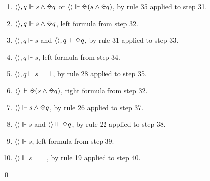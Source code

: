 \begin{myEx}
\begin{enumerate}
\item $\langle \rangle, q \Vdash s \land \LTLonce q$ or $\langle \rangle \Vdash \LTLonce(s \land \LTLonce q)$, by rule 35 applied to step 31.\\ %

\item $\langle \rangle, q \Vdash s \land \LTLonce q$, left formula from step 32.\\ %

\item $\langle \rangle, q \Vdash s$ and $\langle \rangle, q \Vdash \LTLonce q$, by rule 31 applied to step 33.\\ %

\item $\langle \rangle, q \Vdash s$, left formula from step 34.\\ %

\item $\langle \rangle, q \Vdash s = \bot$, by rule 28 applied to step 35.\\ %

\item $\langle \rangle \Vdash \LTLonce(s \land \LTLonce q)$, right formula from step 32.\\ %

\item $\langle \rangle \Vdash s \land \LTLonce q$, by rule 26 applied to step 37.\\ %

\item $\langle \rangle \Vdash s$ and $\langle \rangle \Vdash \LTLonce q$, by rule 22 applied to step 38.\\ %

\item $\langle \rangle \Vdash s$, left formula from step 39.\\ %

\item $\langle \rangle \Vdash s = \bot$, by rule 19 applied to step 40.\\ %
\end{enumerate}
\qed
\end{myEx}
